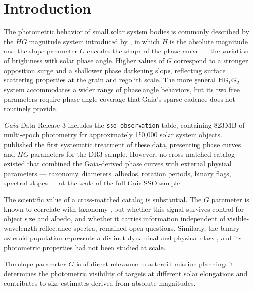 \documentclass{aa}
\newcommand{\gaia}{{\it Gaia}\xspace}
\begin{document}

\maketitle

\section{Introduction}
\label{sec:intro}

The photometric behavior of small solar system bodies is commonly described
by the $HG$ magnitude system introduced by \citet{bowell1989}, in which $H$
is the absolute magnitude and the slope parameter $G$ encodes the shape of
the phase curve — the variation of brightness with solar phase angle.
Higher values of $G$ correspond to a stronger opposition surge and a
shallower phase darkening slope, reflecting surface scattering properties
at the grain and regolith scale.  The more general HG$_1G_2$ system
\citep{muinonen2010} accommodates a wider range of phase angle behaviors,
but its two free parameters require phase angle coverage that Gaia's
sparse cadence does not routinely provide.

\gaia Data Release 3 \citep{prusti2016} includes the \texttt{sso\_observation}
table, containing 823\,MB of multi-epoch photometry for approximately
150,000 solar system objects.  \citet{tanga2023} published the first
systematic treatment of these data, presenting phase curves and $HG$
parameters for the DR3 sample.  However, no cross-matched catalog existed
that combined the Gaia-derived phase curves with external physical parameters
— taxonomy, diameters, albedos, rotation periods, binary flags, spectral
slopes — at the scale of the full Gaia SSO sample.

The scientific value of a cross-matched catalog is substantial.
The $G$ parameter is known to correlate with taxonomy \citep{bowell1989},
but whether this signal survives control for object size and albedo, and
whether it carries information independent of visible-wavelength reflectance
spectra, remained open questions.  Similarly, the binary asteroid population
represents a distinct dynamical and physical class \citep{pravec2007},
and its photometric properties had not been studied at scale.

The slope parameter $G$ is of direct relevance to asteroid mission
planning: it determines the photometric visibility of targets at
different solar elongations and contributes to size estimates derived
from absolute magnitudes.
\end{document}
